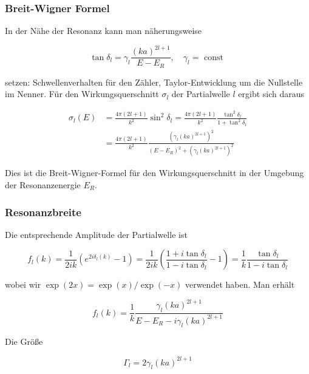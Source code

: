 \documentclass[10pt, letterpaper]{article}
\begin{document}
\subsubsection*{Breit-Wigner Formel}
In der Nähe der Resonanz kann man näherungsweise

$$
\tan \delta_{l}=\gamma_{l} \frac{(k a)^{2 l+1}}{E-E_{R}}, \quad \gamma_{l}=\text { const }
$$

setzen: Schwellenverhalten für den Zähler, Taylor-Entwicklung um die Nullstelle im Nenner. Für den Wirkungsquerschnitt $\sigma_{l}$ der Partialwelle $l$ ergibt sich daraus

$$
\begin{aligned}
\sigma_{l}(E) & =\frac{4 \pi(2 l+1)}{k^{2}} \sin ^{2} \delta_{l}=\frac{4 \pi(2 l+1)}{k^{2}} \frac{\tan ^{2} \delta_{l}}{1+\tan ^{2} \delta_{l}} \\
& =\frac{4 \pi(2 l+1)}{k^{2}} \frac{\left(\gamma_{l}(k a)^{2 l+1}\right)^{2}}{\left(E-E_{R}\right)^{2}+\left(\gamma_{l}(k a)^{2 l+1}\right)^{2}}
\end{aligned}
$$

Dies ist die Breit-Wigner-Formel für den Wirkungsquerschnitt in der Umgebung der Resonanzenergie $E_{R}$.

\subsubsection*{Resonanzbreite}
Die entsprechende Amplitude der Partialwelle ist

$$
f_{l}(k)=\frac{1}{2 i k}\left(e^{2 i \delta_{l}(k)}-1\right)=\frac{1}{2 i k}\left(\frac{1+i \tan \delta_{l}}{1-i \tan \delta_{l}}-1\right)=\frac{1}{k} \frac{\tan \delta_{l}}{1-i \tan \delta_{l}}
$$

wobei wir $\exp (2 x)=\exp (x) / \exp (-x)$ verwendet haben. Man erhält

$$
f_{l}(k)=\frac{1}{k} \frac{\gamma_{l}(k a)^{2 l+1}}{E-E_{R}-i \gamma_{l}(k a)^{2 l+1}}
$$

Die Größe

$$
\Gamma_{l}=2 \gamma_{l}(k a)^{2 l+1}
$$
\end{document}
